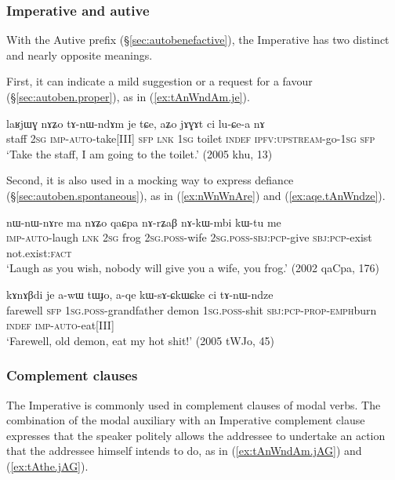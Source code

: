\subsubsection{Imperative and autive} \label{sec:imp.autive}
With the Autive prefix (§\ref{sec:autobenefactive}), the Imperative has two distinct and nearly opposite meanings. 

First, it can indicate a mild suggestion or a request for a favour (§\ref{sec:autoben.proper}), as in (\ref{ex:tAnWndAm.je}).

\begin{exe}
\ex \label{ex:tAnWndAm.je}
\gll laʁjɯɣ nɤʑo tɤ-nɯ-ndɤm je tɕe, aʑo jɤɣɤt ci lu-ɕe-a nɤ \\
staff \textsc{2sg} \textsc{imp}-\textsc{auto}-take[III] \textsc{sfp} \textsc{lnk} \textsc{1sg} toilet \textsc{indef} \textsc{ipfv}:\textsc{upstream}-go-\textsc{1sg} \textsc{sfp} \\
\glt `Take the staff, I am going to the toilet.' (2005 khu, 13)
\end{exe}

Second, it is also used in a mocking way to express defiance (§\ref{sec:autoben.spontaneous}), as in (\ref{ex:nWnWnAre}) and (\ref{ex:aqe.tAnWndze}).

\begin{exe}
\ex  \label{ex:nWnWnAre}
\gll  nɯ-nɯ-nɤre ma nɤʑo qaɕpa nɤ-rʑaβ nɤ-kɯ-mbi kɯ-tu me   \\
\textsc{imp}-\textsc{auto}-laugh \textsc{lnk} \textsc{2sg} frog \textsc{2sg}.\textsc{poss}-wife \textsc{2sg}.\textsc{poss}-\textsc{sbj}:\textsc{pcp}-give \textsc{sbj}:\textsc{pcp}-exist not.exist:\textsc{fact} \\
\glt `Laugh as you wish, nobody will give you a wife, you frog.'   (2002 qaCpa, 176)
\end{exe} 

\begin{exe}
\ex  \label{ex:aqe.tAnWndze}
\gll kɤnɤβdi je a-wɯ tɯɟo, a-qe kɯ-sɤ-ɕkɯ\redp{}ɕke ci tɤ-nɯ-ndze \\
farewell \textsc{sfp} \textsc{1sg}.\textsc{poss}-grandfather demon \textsc{1sg}.\textsc{poss}-shit \textsc{sbj}:\textsc{pcp}-\textsc{prop}-\textsc{emph}\redp{}burn \textsc{indef} \textsc{imp}-\textsc{auto}-eat[III] \\
\glt `Farewell, old demon, eat my hot shit!' (2005 tWJo, 45)
\end{exe}

\subsubsection{Complement clauses} \label{sec:imp.compl}
The Imperative is commonly used in complement clauses of modal verbs. The combination of the modal auxiliary  with an Imperative complement clause expresses that the speaker politely allows the addressee to undertake an action that the addressee himself intends to do, as in (\ref{ex:tAnWndAm.jAG}) and (\ref{ex:tAthe.jAG}).

